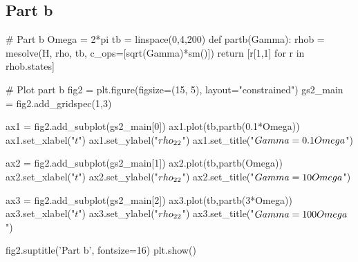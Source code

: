 \subsection*{Part b}
\begin{python}
# Part b
Omega = 2*pi
tb = linspace(0,4,200)
def partb(Gamma):
    rhob = mesolve(H, rho, tb, c_ops=[sqrt(Gamma)*sm()])
    return [r[1,1] for r in rhob.states]
    
# Plot part b
fig2 = plt.figure(figsize=(15, 5), layout="constrained")
gs2_main = fig2.add_gridspec(1,3)

ax1 = fig2.add_subplot(gs2_main[0])
ax1.plot(tb,partb(0.1*Omega))
ax1.set_xlabel("$t$")
ax1.set_ylabel("$\\rho_{22}$")
ax1.set_title("$\\Gamma = 0.1\\Omega$")

ax2 = fig2.add_subplot(gs2_main[1])
ax2.plot(tb,partb(Omega))
ax2.set_xlabel("$t$")
ax2.set_ylabel("$\\rho_{22}$")
ax2.set_title("$\\Gamma = 10\\Omega$")

ax3 = fig2.add_subplot(gs2_main[2])
ax3.plot(tb,partb(3*Omega))
ax3.set_xlabel("$t$")
ax3.set_ylabel("$\\rho_{22}$")
ax3.set_title("$\\Gamma = 100\\Omega$")

fig2.suptitle('Part b', fontsize=16)
plt.show()
\end{python}
